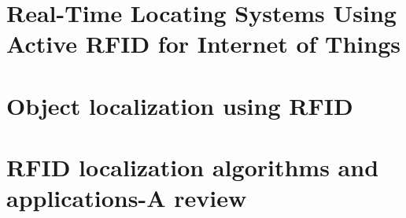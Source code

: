 \section{Real-Time Locating Systems Using Active RFID for Internet of Things}

\section{Object localization using RFID}

\section{RFID localization algorithms and applications-A review}